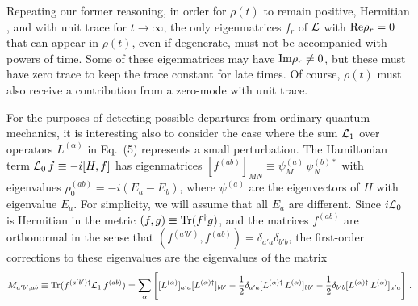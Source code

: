 Repeating our former reasoning, in order for $\rho(t)$ to remain positive, Hermitian , and with unit trace for $t\rightarrow\infty$, the only eigenmatrices  $f_r$ of ${\cal L}$  with ${\rm Re}\rho_r=0$ that can appear in $\rho(t)$, even if degenerate, must  not be accompanied with powers of time.  Some of these eigenmatrices may have ${\rm Im}\rho_r\neq 0$, but these  must have zero trace to keep the trace constant for late times.  Of course, $\rho(t)$ must also receive a contribution from a zero-mode with unit trace.



For the purposes of detecting possible departures from ordinary quantum mechanics, it is interesting also to consider the case where the sum ${\cal L}_1$ over operators $L^{(\alpha)}$ in Eq.~(5) represents a small perturbation.  The Hamiltonian term ${\cal L}_0\,f\equiv -i[H,f]$ has eigenmatrices $[f^{(ab)}]_{MN}\equiv \psi^{(a)}_M\,\psi^{(b)*}_N$ with eigenvalues $\rho_0^{(ab)}=-i(E_a-E_b)$, where $\psi^{(a)}$ are the eigenvectors of $H$ with eigenvalue $E_a$.  For simplicity, we will assume that all $E_a$ are different.   Since $i{\cal L}_0$ is Hermitian in the metric 
$(f,g)\equiv {\rm Tr}(f^\dagger g)$, and the matrices $f^{(ab)}$ are orthonormal in the sense that $(f^{(a'b')},f^{(ab)})=\delta_{a'a}\delta_{b'b}$, the first-order corrections to these eigenvalues are the eigenvalues of the matrix 
\begin{equation}
M_{a'b',ab}\equiv{\rm Tr}(f^{(a'b')\dagger}{\cal L}_1\,f^{(ab)})=\sum_\alpha \Bigg[[L^{(\alpha)}]_{a'a}[L^{(\alpha)\dagger}]_{bb'}-\frac{1}{2}\delta_{a'a}[L^{(\alpha)\dagger}\,L^{(\alpha)}]_{bb'}-\frac{1}{2}\delta_{b'b}[L^{(\alpha)\dagger}\,L^{(\alpha)}]_{a'a}\Bigg]\;.
\end{equation}

